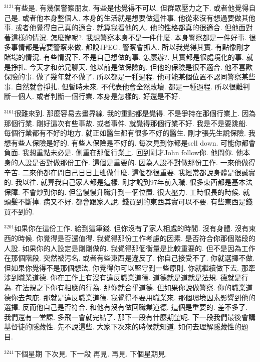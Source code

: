 \documentclass{book}
\begin{document}
$^{3121}$有些是.
有幾個警察朋友.
有些是他覺得不可以.
但群眾壓力之下.
或者他覺得自己是.
或者他本身整個人.
本身的生活就是想要做這件事.
他從來沒有想過要做其他事.
或者他覺得自己真的適合.
就算我看他的人.
他的性格都真的很適合.
但他面對著這樣的情況.
怎麼辦呢?.
我想警察本身不是一件什麼.
本身警察都是一件好事.
很多事情都是需要警察來做.
都說JPEG.
警察會抓人.
所以我覺得其實.
有點像剛才賭場的情況.
有些情況下.
不是自己想做的事.
怎麼辦?.
其實都是很處境化的事.
就是掙扎.
今天才和弟兄聊天.
他以前是做保險的.
但他的保險是很不適合.
他不喜歡保險的事.
做了幾年就不做了.
所以都是一種過程.
他可能某個位置不認同警察某些事.
自然就會掙扎.
但暫時未來.
不代表他會全然敗壞.
都是一種過程.
所以很難判斷一個人.
或者判斷一個行業.
本身是怎樣的.
好還是不好.

$^{3161}$很難來到.
那麼容易去畫界線.
我的重點都是覺得.
不是爭持在那個行業上.
因為那個行業.
剛好這次有些事故.
或者事件.
就覺得那個行業不好.
我是不是要跳船.
每個行業都有不好的地方.
就正如醫生都有很多不好的醫生.
剛才張先生說保險.
我想有些人保險是好的.
有些人保險是不好的.
每次見到你都是sell down.
可能你都會負面.
我想重點未必是.
側重在那個行業上.
回到剛才John follow你.
他問你.
他本身的人設是否對做那份工作.
這個是重要的.
因為人設不對做那份工作.
一來他做得辛苦.
二來他都在問自己日日上班做什麼.
這個都很重要.
我經常都說身體是很誠實的.
我以往.
就算我自己家人都是這樣.
剛才說到97年前入職.
很多東西都是基本法保障.
不會炒到你的.
但當慢慢升職升到一個位置.
很大壓力.
工時很長的時候.
就頭髮不斷掉.
病又不好.
都會跟家人說.
錢買到的東西其實可以不要.
有些東西是錢買不到的.

$^{3201}$如果你在這份工作.
給到這筆錢.
但你沒有了家人相處的時間.
沒有身體.
沒有東西的時候.
你覺得是否還值得.
我覺得那份工作考慮的因素.
是否符合你那個階段的人設.
如果你的人設定是剛剛做的.
我覺得那個衡量是比較重要的.
但不是因為工作在那個階段.
突然被污名.
或者有些東西是違反了.
你自己接受不了.
你就選擇不做.
但如果你覺得不是那個想法.
你覺得你可以堅守到一些原則.
你就繼續做下去.
那牽涉到職業道德.
你在工作上有沒有違反職業道德.
道德就是道就是法規.
德就是行為.
在法規之下你有相應的行為.
那你就合乎道德.
但如果你說做警察.
你的職業道德你去包庇.
那就是違反職業道德.
我覺得不要用職業來.
那個環境因素影響到他的選擇.
反而他自己是否符合.
和他有沒有做回職業道德.
這個是重要的.
差不多了.
我們還有一堂課.
多飛一會就完結了.
那下一段有什麼期望呢.
下一段我們最後會講基督徒的隱藏性.
先不說這些.
大家下次來的時候就知道.
如何去理解隱藏性的題目.

$^{3241}$下個星期 下次見.
下一段 再見.
再見.
下個星期見.
\newpage
\end{document}
